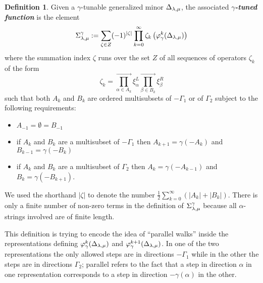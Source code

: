 \documentclass[a4paper]{amsart}
\theoremstyle{definition}
\newtheorem{definition}[theorem]{Definition}
\newcommand{\newword}[1]{\textbf{\emph{#1}}}
\begin{document}
\begin{definition}
  Given a $\gamma$-tunable generalized minor $\minor[\lambda][\mu]$, the associated \newword{$\gamma$-tuned function} is the element
  \[
    \function[\lambda][\mu] := \sum_{\zeta\in Z} (-1)^{|\zeta|} \prod_{k=0}^\infty \zeta_k\left(\varphi_\gamma^k(\minor[\lambda][\mu])\right)
  \]
  where the summation index $\zeta$ runs over the set $Z$ of all sequences of operators $\zeta_k$ of the form
  \[
    \zeta_k = \prod_{\alpha\in A_k}^\rightarrow  \xi^L_\alpha \prod_{\beta\in B_k}^\rightarrow \xi^R_\beta
  \] 
  such that both $A_k$ and $B_k$ are ordered multisubsets of $-\Gamma_1$ or of $\Gamma_2$ subject to the following requirements:
  \begin{itemize}
    \item 
      $A_{-1} = \emptyset = B_{-1} $
    \item
      if $A_k$ and $B_k$ are a multisubset of $-\Gamma_1$ then $A_{k+1} = \gamma(-A_k)$ and $B_{k-1} = \gamma(-B_k)$
    \item
      if $A_k$ and $B_k$ are a multisubset of $\Gamma_2$ then $A_k = \gamma(-A_{k-1})$ and $B_k = \gamma(-B_{k+1})$.
  \end{itemize}
  We used the shorthand $|\zeta|$ to denote the number $\frac{1}{2}\sum_{k=0}^\infty (|A_k|+|B_k|)$.
  There is only a finite number of non-zero terms in the definition of $\function[\lambda][\mu]$ because all $\alpha$-strings involved are of finite length.
\end{definition}

This definition is trying to encode the idea of ``parallel walks'' inside the representations defining $\varphi_\gamma^k(\minor[\lambda][\mu])$ and $\varphi_\gamma^{k+1}(\minor[\lambda][\mu])$.
In one of the two representations the only allowed steps are in directions $-\Gamma_1$ while in the other the steps are in directions $\Gamma_2$; parallel refers to the fact that a step in direction $\alpha$ in one representation corresponds to a step in direction $-\gamma(\alpha)$ in the other.  
\end{document}
